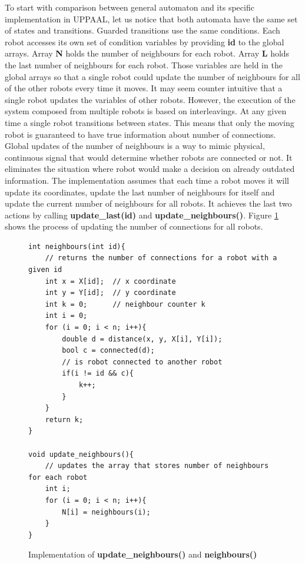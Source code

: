 To start with comparison between general automaton and its specific implementation in UPPAAL, let us notice that both automata have the same set of states and transitions. Guarded transitions use the same conditions. Each robot accesses its own set of condition variables by providing \textbf{id} to the global arrays. Array \textbf{N} holds the number of neighbours for each robot. Array \textbf{L} holds the last number of neighbours for each robot. Those variables are held in the global arrays so that a single robot could update the number of neighbours for all of the other robots every time it moves. It may seem counter intuitive that a single robot updates the variables of other robots. However, the execution of the system composed from multiple robots is based on interleavings. At any given time a single robot transitions between states. This means that only the moving robot is guaranteed to have true information about number of connections. Global updates of the number of neighbours is a way to mimic physical, continuous signal that would determine whether robots are connected or not. It eliminates the situation where robot would make a decision on already outdated information. The implementation assumes that each time a robot moves it will update its coordinates, update the last number of neighbours for itself and update the current number of neighbours for all robots. It achieves the last two actions by calling \textbf{update\_last(id)} and \textbf{update\_neighbours()}. Figure \ref{fig:neighbours} shows the process of updating the number of connections for all robots.
\begin{figure}[H]
\caption{Implementation of \textbf{update\_neighbours()} and \textbf{neighbours()}}
\lstset { language=C++ }
\begin{lstlisting}
int neighbours(int id){
    // returns the number of connections for a robot with a given id
    int x = X[id];  // x coordinate
    int y = Y[id];  // y coordinate
    int k = 0;      // neighbour counter k
    int i = 0;   
    for (i = 0; i < n; i++){
        double d = distance(x, y, X[i], Y[i]);
        bool c = connected(d);
        // is robot connected to another robot
        if(i != id && c){
            k++;
        }
    }
    return k;
}

void update_neighbours(){
    // updates the array that stores number of neighbours for each robot
    int i;
    for (i = 0; i < n; i++){
        N[i] = neighbours(i);
    }
}
\end{lstlisting}
\label{fig:neighbours}
\end{figure}


